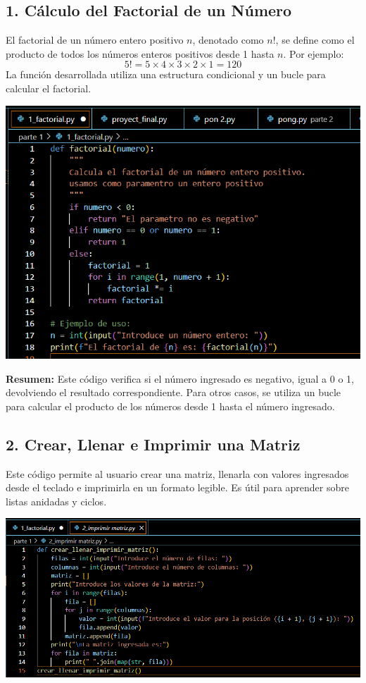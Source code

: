 \documentclass{article}
\begin{document}
\subsection*{1. Cálculo del Factorial de un Número}
El factorial de un número entero positivo $n$, denotado como $n!$, se define como el producto de todos los números enteros positivos desde 1 hasta $n$. Por ejemplo:
\[
5! = 5 \times 4 \times 3 \times 2 \times 1 = 120
\]
La función desarrollada utiliza una estructura condicional y un bucle para calcular el factorial.

\begin{center}
\includegraphics[width=\textwidth]{codigo1.jpg} %
\end{center}

\noindent \textbf{Resumen:} Este código verifica si el número ingresado es negativo, igual a 0 o 1, devolviendo el resultado correspondiente. Para otros casos, se utiliza un bucle para calcular el producto de los números desde 1 hasta el número ingresado.

\subsection*{2. Crear, Llenar e Imprimir una Matriz}
Este código permite al usuario crear una matriz, llenarla con valores ingresados desde el teclado e imprimirla en un formato legible. Es útil para aprender sobre listas anidadas y ciclos.

\begin{center}
\includegraphics[width=\textwidth]{codigo2.jpg} %
\end{center}
\end{document}
